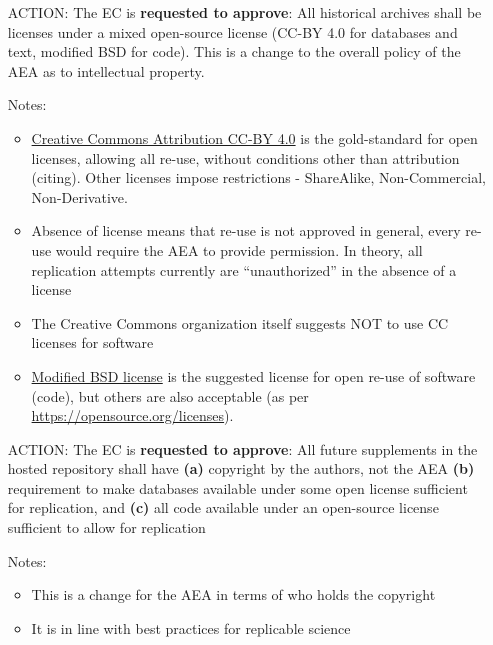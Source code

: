 \documentclass[AEJ]{AEA}
\begin{document}
\begin{itemize}
	\item[ACTION:] The EC is \textbf{requested to approve}: All historical archives shall be licenses   under a mixed open-source license (CC-BY 4.0 for databases and text,  modified BSD for  code). This is a change to the overall policy of the AEA as to intellectual property.
	\item[Notes:]
	\begin{itemize}
		\item \href{https://creativecommons.org/licenses/by/4.0/}{Creative Commons Attribution CC-BY 4.0} is the gold-standard for open licenses, allowing all re-use, without conditions other than attribution (citing). Other licenses impose restrictions - ShareAlike, Non-Commercial, Non-Derivative. 
	    \item Absence of license means that re-use is not approved in general, every re-use would require the AEA to provide permission. In theory, all replication attempts currently are ``unauthorized'' in the absence of a license
	    \item The Creative Commons organization itself suggests NOT to use CC licenses for software
	    \item \href{https://opensource.org/licenses/BSD-3-Clause}{Modified BSD license} is the suggested license for open re-use of software (code), but others are also acceptable (as per \url{https://opensource.org/licenses}). 
	\end{itemize}
	\item[ACTION:] The EC is \textbf{requested to approve}: All future supplements in the hosted repository shall have \textbf{(a)} copyright by the authors, not the AEA \textbf{(b)} requirement to make databases available under some open license sufficient for replication, and \textbf{(c)}  all code available under an open-source license sufficient to allow for replication
	\item[Notes:]
	\begin{itemize}
		\item This is a change for the AEA in terms of who holds the copyright
		\item It is in line with best practices for replicable science
	\end{itemize}
\end{itemize}
\end{document}
